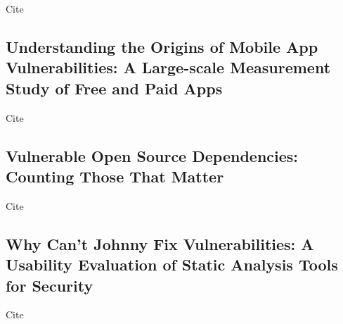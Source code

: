 Cite~\cite{larochelle2001}



\subsection{Understanding the Origins of Mobile App Vulnerabilities: A Large-scale Measurement Study of Free and Paid Apps}
\label{subsec:understanding-the-origins-of-mobile-app-vulnerabilities:-a-large-scale-measurement-study-of-free-and-paid-apps}

Cite~\cite{watanabe2017}



\subsection{Vulnerable Open Source Dependencies: Counting Those That Matter}
\label{subsec:vulnerable-open-source-dependencies:-counting-those-that-matter}

Cite~\cite{pashchenko2018}



\subsection{Why Can’t Johnny Fix Vulnerabilities: A Usability Evaluation of Static Analysis Tools for Security}
\label{subsec:why-can’t-johnny-fix-vulnerabilities:-a-usability-evaluation-of-static-analysis-tools-for-security}

Cite~\cite{smith2020}
